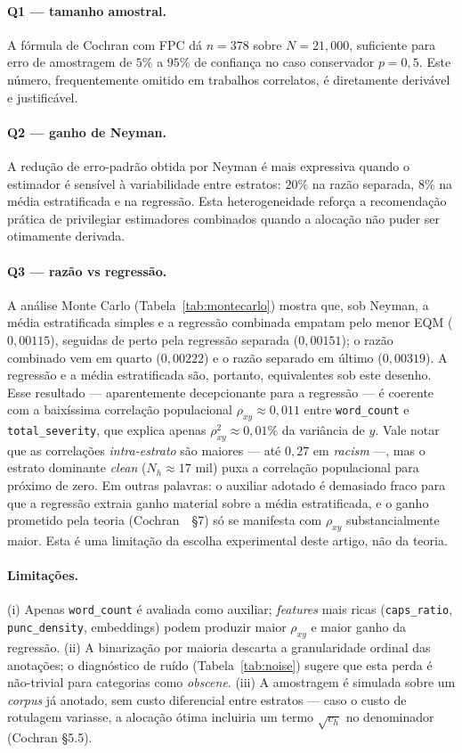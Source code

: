 \paragraph{Q1 — tamanho amostral.} A fórmula de Cochran com FPC dá $n=378$
sobre $N=21{,}000$, suficiente para erro de amostragem de $5\%$ a $95\%$ de
confiança no caso conservador $p=0{,}5$. Este número, frequentemente omitido
em trabalhos correlatos, é diretamente derivável e justificável.

\paragraph{Q2 — ganho de Neyman.} A redução de erro-padrão obtida por Neyman
é mais expressiva quando o estimador é sensível à variabilidade entre
estratos: $20\%$ na razão separada, $8\%$ na média estratificada e na
regressão. Esta heterogeneidade reforça a recomendação prática de privilegiar
estimadores combinados quando a alocação não puder ser otimamente derivada.

\paragraph{Q3 — razão vs regressão.} A análise Monte Carlo
(Tabela~\ref{tab:montecarlo}) mostra que, sob Neyman, a média estratificada
simples e a regressão combinada empatam pelo menor EQM ($0{,}00115$), seguidas
de perto pela regressão separada ($0{,}00151$); o razão combinado vem em
quarto ($0{,}00222$) e o razão separado em último ($0{,}00319$). A
regressão e a média estratificada são, portanto, equivalentes sob este
desenho. Esse resultado --- aparentemente decepcionante para a regressão ---
é coerente com a baixíssima correlação populacional
$\rho_{xy} \approx 0{,}011$ entre \texttt{word\_count} e
\texttt{total\_severity}, que explica apenas $\rho_{xy}^{2} \approx 0{,}01\%$
da variância de $y$. Vale notar que as correlações \emph{intra-estrato} são
maiores --- até $0{,}27$ em \textit{racism} ---, mas o estrato dominante
\textit{clean} ($N_h \approx 17$ mil) puxa a correlação populacional para
próximo de zero. Em outras palavras: o auxiliar adotado é demasiado fraco
para que a regressão extraia ganho material sobre a média estratificada, e o
ganho prometido pela teoria (Cochran~\cite{cochran1977}~§7) só se manifesta
com $\rho_{xy}$ substancialmente maior. Esta é uma limitação da escolha
experimental deste artigo, não da teoria.

\paragraph{Limitações.} (i) Apenas \texttt{word\_count} é avaliada como
auxiliar; \textit{features} mais ricas (\texttt{caps\_ratio},
\texttt{punc\_density}, embeddings) podem produzir maior $\rho_{xy}$ e maior
ganho da regressão. (ii) A binarização por maioria descarta a granularidade
ordinal das anotações; o diagnóstico de ruído (Tabela~\ref{tab:noise}) sugere
que esta perda é não-trivial para categorias como \textit{obscene}. (iii) A
amostragem é simulada sobre um \textit{corpus} já anotado, sem custo
diferencial entre estratos --- caso o custo de rotulagem variasse, a
alocação ótima incluiria um termo $\sqrt{c_h}$ no denominador
(Cochran §5.5).
